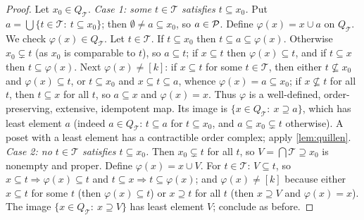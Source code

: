 \begin{proof}
Let $x_0\in Q_{\mathcal T}$.
\emph{Case 1: some $t\in\mathcal T$ satisfies $t\subseteq x_0$.} Put $a=\bigcup\{t\in\mathcal T:\ t\subseteq x_0\}$; then $\emptyset\neq a\subseteq x_0$, so $a\in\mathcal{P}$. Define $\varphi(x)=x\cup a$ on $Q_{\mathcal T}$. We check $\varphi(x)\in Q_{\mathcal T}$. Let $t\in\mathcal T$. If $t\subseteq x_0$ then $t\subseteq a\subseteq\varphi(x)$. Otherwise $x_0\subsetneq t$ (as $x_0$ is comparable to $t$), so $a\subseteq t$; if $x\subseteq t$ then $\varphi(x)\subseteq t$, and if $t\subseteq x$ then $t\subseteq\varphi(x)$. Next $\varphi(x)\ne[k]$: if $x\subseteq t$ for some $t\in\mathcal T$, then either $t\not\subseteq x_0$ and $\varphi(x)\subseteq t$, or $t\subseteq x_0$ and $x\subseteq t\subseteq a$, whence $\varphi(x)=a\subseteq x_0$; if $x\not\subseteq t$ for all $t$, then $t\subseteq x$ for all $t$, so $a\subseteq x$ and $\varphi(x)=x$. Thus $\varphi$ is a well-defined, order-preserving, extensive, idempotent map. Its image is $\{x\in Q_{\mathcal T}:\ x\supseteq a\}$, which has least element $a$ (indeed $a\in Q_{\mathcal T}$: $t\subseteq a$ for $t\subseteq x_0$, and $a\subseteq x_0\subsetneq t$ otherwise). A poset with a least element has a contractible order complex; apply \cref{lem:quillen}.
\emph{Case 2: no $t\in\mathcal T$ satisfies $t\subseteq x_0$.} Then $x_0\subsetneq t$ for all $t$, so $V=\bigcap\mathcal T\supseteq x_0$ is nonempty and proper. Define $\varphi(x)=x\cup V$. For $t\in\mathcal T$: $V\subseteq t$, so $x\subseteq t\Rightarrow\varphi(x)\subseteq t$ and $t\subseteq x\Rightarrow t\subseteq\varphi(x)$; and $\varphi(x)\ne[k]$ because either $x\subseteq t$ for some $t$ (then $\varphi(x)\subseteq t$) or $x\supseteq t$ for all $t$ (then $x\supseteq V$ and $\varphi(x)=x$). The image $\{x\in Q_{\mathcal T}:\ x\supseteq V\}$ has least element $V$; conclude as before.
\end{proof}
